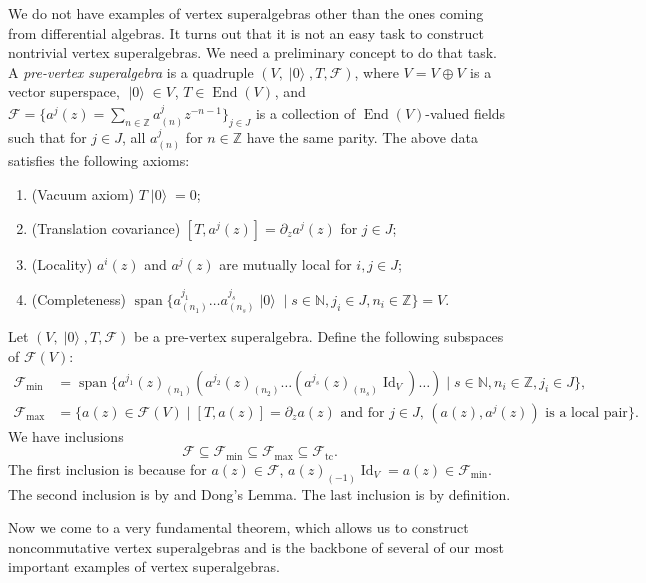 \documentclass[a4paper, 12pt, reqno]{amsart}
\theoremstyle{remark}
\DeclareMathOperator{\Id}{Id}
\DeclareMathOperator{\End}{End}
\DeclareMathOperator{\vspan}{span}
\DeclareMathOperator{\vac}{|0\rangle}
\DeclareMathOperator{\zero}{\overline{0}}
\DeclareMathOperator{\one}{\overline{1}}
\DeclareMathOperator{\tc}{tc}
\begin{document}
We do not have examples of vertex superalgebras other than the ones coming from differential algebras.
It turns out that it is not an easy task to construct nontrivial vertex superalgebras.
We need a preliminary concept to do that task.
A \emph{pre-vertex superalgebra} is a quadruple $(V, \vac, T, \mathcal{F})$, where $V = V_{\zero} \oplus V_{\one}$ is a vector superspace, $\vac \in V_{\zero}$, $T \in \End(V)_{\zero}$, and $\mathcal{F} = \{a^j(z) = \sum_{n \in \mathbb{Z}}a^j_{(n)}z^{-n - 1}\}_{j \in J}$ is a collection of $\End(V)$-valued fields such that for $j \in J$, all $a^j_{(n)}$ for $n \in \mathbb{Z}$ have the same parity.
The above data satisfies the following axioms:
\begin{enumerate}
\item (Vacuum axiom) $T\vac = 0$;
\item (Translation covariance) $[T, a^j(z)] = \partial_za^j(z)$ for $j \in J$;
\item (Locality) $a^i(z)$ and $a^j(z)$ are mutually local for $i, j \in J$;
\item (Completeness) $\vspan\{a^{j_1}_{(n_1)}\dots a^{j_s}_{(n_s)}\vac \mid s \in \mathbb{N}, j_i \in J, n_i \in \mathbb{Z}\} = V$.
\end{enumerate}

Let $(V, \vac, T, \mathcal{F})$ be a pre-vertex superalgebra.
Define the following subspaces of $\mathcal{F}(V)$:
\begin{align*}
  \mathcal{F}_{\min} &= \vspan\{a^{j_1}(z)_{(n_1)}(a^{j_2}(z)_{(n_2)}\dots(a^{j_s}(z)_{(n_s)}\Id_V)\dots) \mid s \in \mathbb{N}, n_i \in \mathbb{Z}, j_i \in J\}, \\
  \mathcal{F}_{\max} &= \{a(z) \in \mathcal{F}(V) \mid \text{$[T, a(z)] = \partial_za(z)$ and for $j \in J$, $(a(z), a^j(z))$ is a local pair}\}.
\end{align*}
We have inclusions
\begin{equation*}
  \mathcal{F} \subseteq \mathcal{F}_{\min} \subseteq \mathcal{F}_{\max} \subseteq \mathcal{F}_{\tc}.
\end{equation*}
The first inclusion is because for $a(z) \in \mathcal{F}$, $a(z)_{(-1)}\Id_V = a(z) \in \mathcal{F}_{\min}$.
The second inclusion is by  and Dong's Lemma.
The last inclusion is by definition.

Now we come to a very fundamental theorem, which allows us to construct noncommutative vertex superalgebras and is the backbone of several of our most important examples of vertex superalgebras.
\end{document}
